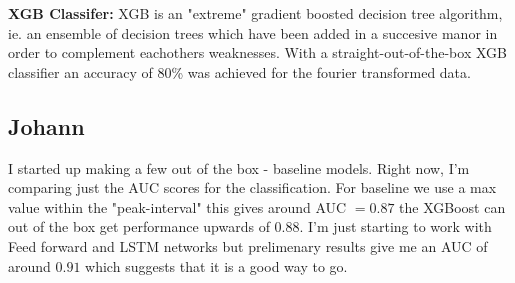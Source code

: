 \documentclass{article}
\begin{document}
\textbf{XGB Classifer:}
XGB is an "extreme" gradient boosted decision tree algorithm, ie. an ensemble of decision trees which have been added in a succesive manor in order to complement eachothers weaknesses.
With a straight-out-of-the-box XGB classifier an accuracy of 80\% was achieved for the fourier transformed data.


\subsection{Johann}
I started up making a few out of the box - baseline models. Right now, I'm comparing just the AUC scores for the classification. For baseline we use a max value within the "peak-interval" this gives around AUC $= 0.87$ the XGBoost can out of the  box get performance upwards of $0.88$. I'm just starting to work with Feed forward and LSTM networks but prelimenary results give me an AUC of around $0.91$ which suggests that it is a good way to go. 
\end{document}
